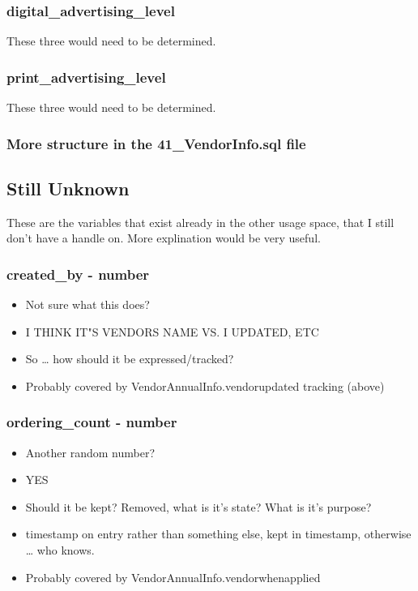 \documentclass[captions=tablesignature]{scrartcl}
\begin{document}
\subsubsection{digital\_advertising\_level}
\label{sec-2-5-8}
These three would need to be determined.

\subsubsection{print\_advertising\_level}
\label{sec-2-5-9}
These three would need to be determined.

\subsubsection{More structure in the 41\_VendorInfo.sql file}
\label{sec-2-5-10}

\subsection{Still Unknown}
\label{sec-2-6}
These are the variables that exist already in the other usage
space, that I still don't have a handle on.  More explination would
be very useful.
\subsubsection{created\_by - number}
\label{sec-2-6-1}
\begin{itemize}
\item Not sure what this does?
\item I THINK IT"S VENDORS NAME VS. I UPDATED, ETC
\item So \ldots{} how should it be expressed/tracked?
\item Probably covered by VendorAnnualInfo.vendorupdated tracking (above)
\end{itemize}

\subsubsection{ordering\_count - number}
\label{sec-2-6-2}
\begin{itemize}
\item Another random number?
\item YES
\item Should it be kept?  Removed, what is it's state?  What is it's
purpose?
\item timestamp on entry rather than something else, kept in
timestamp, otherwise \ldots{} who knows.
\item Probably covered by VendorAnnualInfo.vendorwhenapplied
\end{itemize}
\end{document}
